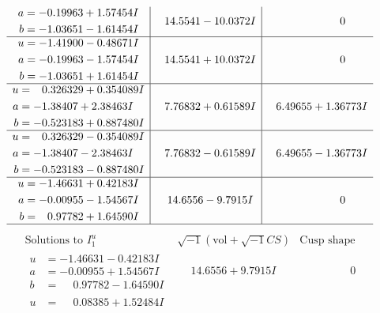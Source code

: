 \documentclass[1p]{elsarticle_modified}
\theoremstyle{definition}
\newcommand{\I}{\sqrt{-1}}
\begin{document}
$$\begin{array}{c|c|c}
\begin{aligned}
a &= -0.19963 + 1.57454 I \\
b &= -1.03651 - 1.61454 I\end{aligned}
 & \phantom{-}14.5541 - 10.0372 I & \phantom{-0.000000 } 0 \\ \hline\begin{aligned}
u &= -1.41900 - 0.48671 I \\
a &= -0.19963 - 1.57454 I \\
b &= -1.03651 + 1.61454 I\end{aligned}
 & \phantom{-}14.5541 + 10.0372 I & \phantom{-0.000000 } 0 \\ \hline\begin{aligned}
u &= \phantom{-}0.326329 + 0.354089 I \\
a &= -1.38407 + 2.38463 I \\
b &= -0.523183 + 0.887480 I\end{aligned}
 & \phantom{-}7.76832 + 0.61589 I & \phantom{-}6.49655 + 1.36773 I \\ \hline\begin{aligned}
u &= \phantom{-}0.326329 - 0.354089 I \\
a &= -1.38407 - 2.38463 I \\
b &= -0.523183 - 0.887480 I\end{aligned}
 & \phantom{-}7.76832 - 0.61589 I & \phantom{-}6.49655 - 1.36773 I \\ \hline\begin{aligned}
u &= -1.46631 + 0.42183 I \\
a &= -0.00955 - 1.54567 I \\
b &= \phantom{-}0.97782 + 1.64590 I\end{aligned}
 & \phantom{-}14.6556 - 9.7915 I & \phantom{-0.000000 } 0\\
 \hline 
 \end{array}$$\newpage$$\begin{array}{c|c|c}  
\text{Solutions to }I^u_{1}& \I (\text{vol} + \sqrt{-1}CS) & \text{Cusp shape}\\
 \hline 
\begin{aligned}
u &= -1.46631 - 0.42183 I \\
a &= -0.00955 + 1.54567 I \\
b &= \phantom{-}0.97782 - 1.64590 I\end{aligned}
 & \phantom{-}14.6556 + 9.7915 I & \phantom{-0.000000 } 0 \\ \hline\begin{aligned}
u &= \phantom{-}0.08385 + 1.52484 I \\

\end{aligned}
\end{array}$$
\end{document}
